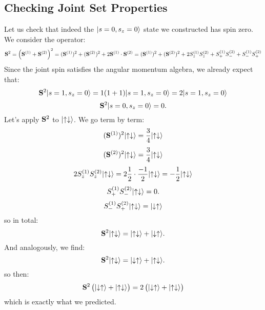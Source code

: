 \subsection{Checking Joint Set Properties}
Let us check that indeed the $\lvert s=0, s_z = 0 \rangle$ state we constructed has spin zero. We consider the operator:
\begin{equation}
    \mathbf{S}^2 = \left(\mathbf{S}^{(1)} + \mathbf{S}^{(2)}\right)^2 = (\mathbf{S}^{(1)})^2 + (\mathbf{S}^{(2)})^2 + 2\mathbf{S}^{(1)} \cdot \mathbf{S}^{(2)} =  (\mathbf{S}^{(1)})^2 + (\mathbf{S}^{(2)})^2 + 2S_z^{(1)}S_z^{(2)} + S_+^{(1)}S_-^{(2)} + S_-^{(1)}S_+^{(2)}
\end{equation}
Since the joint spin satisfies the angular momentum algebra, we already expect that:
\begin{equation}
    \mathbf{S}^2\lvert s = 1, s_z = 0 \rangle = 1(1+1)\lvert s=1, s_z = 0 \rangle = 2\lvert s=1, s_z = 0 \rangle
\end{equation}
\begin{equation}
    \mathbf{S}^2\lvert s=0, s_z=0 \rangle = 0.
\end{equation}
Let's apply $\mathbf{S}^2$ to $\lvert \uparrow\downarrow \rangle$. We go term by term:
\begin{equation}
    (\mathbf{S}^{(1)})^2\lvert \uparrow\downarrow \rangle = \frac{3}{4}\lvert \uparrow\downarrow \rangle
\end{equation}
\begin{equation}
    (\mathbf{S}^{(2)})^2\lvert \uparrow\downarrow \rangle = \frac{3}{4}\lvert \uparrow\downarrow \rangle
\end{equation}
\begin{equation}
   2S_z^{(1)}S_z^{(2)}\lvert \uparrow\downarrow \rangle = 2\frac{1}{2}\cdot \frac{-1}{2}\lvert \uparrow\downarrow \rangle = -\frac{1}{2}\lvert \uparrow\downarrow \rangle
\end{equation}
\begin{equation}
    S_+^{(1)}S_-^{(2)}\lvert \uparrow\downarrow \rangle = 0.
\end{equation}
\begin{equation}
    S_-^{(1)}S_+^{(2)}\lvert \uparrow\downarrow \rangle = \lvert \downarrow\uparrow \rangle
\end{equation}
so in total:
\begin{equation}
    \mathbf{S}^2\lvert \uparrow\downarrow \rangle = \lvert \uparrow\downarrow \rangle + \lvert \downarrow\uparrow \rangle.
\end{equation}
And analogously, we find:
\begin{equation}
    \mathbf{S}^2\lvert \uparrow\downarrow \rangle = \lvert \downarrow\uparrow \rangle + \lvert \uparrow\downarrow \rangle.
\end{equation}
so then:
\begin{equation}
    \mathbf{S}^2\left(\lvert \downarrow\uparrow \rangle + \lvert \uparrow\downarrow \rangle\right) = 2\left(\lvert \downarrow\uparrow \rangle + \lvert \uparrow\downarrow \rangle\right)
\end{equation}
which is exactly what we predicted.

